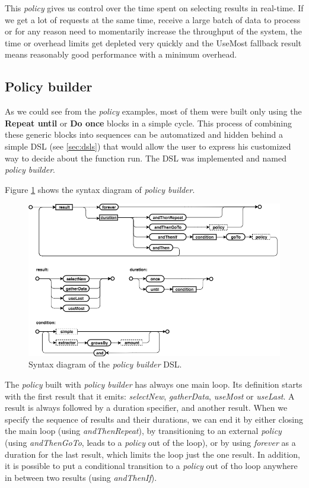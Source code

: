This \textit{policy} gives us control over the time spent on selecting results in real-time. If we get a lot of requests at the same time, receive a large batch of data to process or for any reason need to momentarily increase the throughput of the system, the time or overhead limits get depleted very quickly and the UseMost fallback result means reasonably good performance with a minimum overhead.

\subsection{Policy builder}

As we could see from the \textit{policy} examples, most of them were built only using the \textbf{Repeat until} or \textbf{Do once} blocks in a simple cycle. This process of combining these generic blocks into sequences can be automatized and hidden behind a simple DSL (see \ref{sec:dsls}) that would allow the user to express his customized way to decide about the function run. The DSL was implemented and named \textit{policy builder}.

Figure \ref{fig:policy_builder_chart} shows the syntax diagram of \textit{policy builder}.

\begin{figure}[h!]
	\captionsetup{justification=centering,margin=0.5cm}
	\centerline{\mbox{\includegraphics[width=130mm]{./img/policy_builder_chart.png}}}
	\caption{Syntax diagram of the \textit{policy builder} DSL.}
	\label{fig:policy_builder_chart}
\end{figure}

The \textit{policy} built with \textit{policy builder} has always one main loop. Its definition starts with the first result that it emits: \textit{selectNew}, \textit{gatherData}, \textit{useMost} or \textit{useLast}. A result is always followed by a duration specifier, and another result. When we specify the sequence of results and their durations, we can end it by either closing the main loop (using \textit{andThenRepeat}), by transitioning to an external \textit{policy} (using \textit{andThenGoTo}, leads to a \textit{policy} out of the loop), or by using \textit{forever} as a duration for the last result, which limits the loop just the one result. In addition, it is possible to put a conditional transition to a \textit{policy} out of tho loop anywhere in between two results (using \textit{andThenIf}).

